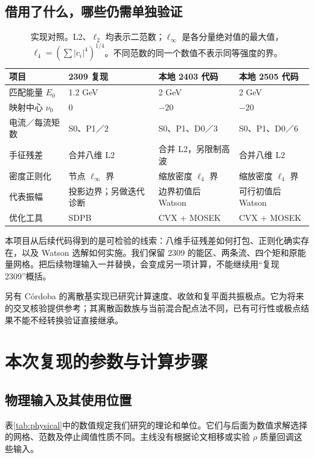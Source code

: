 \documentclass[UTF8,a4paper,11pt,fontset=fandol]{ctexart}
\numberwithin{equation}{section}
\newcommand{\newchapter}[1]{\FloatBarrier\Needspace{9\baselineskip}\section{#1}}
\begin{document}
\subsection{借用了什么，哪些仍需单独验证}
\begin{table}[H]\centering\small
\begin{tabularx}{\linewidth}{P{27mm}YYY}
\toprule
项目 & 2309 复现 & 本地 2403 代码 & 本地 2505 代码\\
\midrule
匹配能量 \(E_0\) & 1.2 GeV & 2 GeV & 2 GeV\\
映射中心 \(\nu_0\) & 0 & \(-20\) & \(-20\)\\
电流／每流矩数 & S0、P1／2 & S0、P1、D0／3 & S0、P1、D0／6\\
手征残差 & 合并八维 L2 & 合并 L2，另限制高波 & 合并八维 L2\\
密度正则化 & 节点 \(\ell_\infty\) 界 & 缩放密度 \(\ell_4\) 界 & 缩放密度 \(\ell_4\) 界\\
代表振幅 & 投影边界；另做迭代诊断 & 边界初值后 Watson & 可行初值后 Watson\\
优化工具 & SDPB & CVX + MOSEK & CVX + MOSEK\\
\bottomrule
\end{tabularx}
\caption{实现对照。L2、\(\ell_2\) 均表示二范数；\(\ell_\infty\) 是各分量绝对值的最大值，\(\ell_4=(\sum|c_i|^4)^{1/4}\)。不同范数的同一个数值不表示同等强度的界。}
\end{table}

本项目从后续代码得到的是可检验的线索：八维手征残差如何打包、正则化确实存在，以及 Watson 选解如何实施。我们保留 2309 的能区、两条流、四个矩和原能量网格。把后续物理输入一并替换，会变成另一项计算，不能继续用“复现 2309”概括。

另有 Córdoba 的离散基实现\cite{cordoba}已研究计算速度、收敛和复平面共振极点。它为将来的交叉核验提供参考；其离散函数族与当前混合配点法不同，已有可行性或极点结果不能不经转换验证直接继承。
\newchapter{本次复现的参数与计算步骤}\label{sec:setup}
\subsection{物理输入及其使用位置}
表\ref{tab:physical}中的数值规定我们研究的理论和单位。它们与后面为数值求解选择的网格、范数及停止阈值性质不同。主线没有根据论文相移或实验 \(\rho\) 质量回调这些输入。
\end{document}

